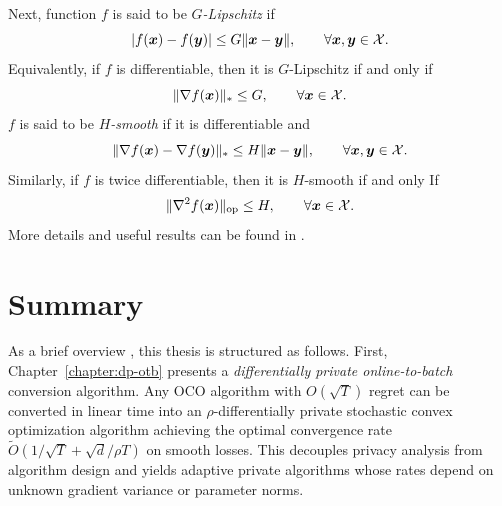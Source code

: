 Next, function $f$ is said to be \emph{$G$-Lipschitz} if 
\begin{equation}
    |f({\boldsymbol{x}}) - f({\boldsymbol{y}})| \le G\|{\boldsymbol{x}} - {\boldsymbol{y}}\|, \qquad \forall {\boldsymbol{x}},{\boldsymbol{y}}\in{\cal X}.
    \label{eqn:ch1:Lipschitz-defn}
\end{equation}
Equivalently, if $f$ is differentiable, then it is $G$-Lipschitz if and only if 
\begin{equation}
    \|\nabla f({\boldsymbol{x}})\|_\ast \le G, \qquad \forall {\boldsymbol{x}} \in {\cal X}.
    \label{eqn:ch1:Lipschitz}
\end{equation}
$f$ is said to be \emph{$H$-smooth} if it is differentiable and 
\begin{equation}
    \|\nabla f({\boldsymbol{x}}) - \nabla f({\boldsymbol{y}})\|_\ast \le H \|{\boldsymbol{x}}-{\boldsymbol{y}}\|, \qquad \forall {\boldsymbol{x}},{\boldsymbol{y}}\in{\cal X}.
    \label{eqn:ch1:smooth}
\end{equation}
Similarly, if $f$ is twice differentiable, then it is $H$-smooth if and only If
\begin{equation}
    \|\nabla^2 f({\boldsymbol{x}})\|_{\mathrm{op}} \le H, \qquad \forall {\boldsymbol{x}}\in{\cal X}.
\end{equation}
More details and useful results can be found in \citep{rockafellar1997convex}.





\section{Summary}
\label{sec:ch1:summary}

As a brief overview , this thesis is structured as follows. First, Chapter~\ref{chapter:dp-otb} presents a \emph{differentially private online-to-batch} conversion algorithm. Any OCO algorithm with $O(\sqrt{T})$ regret can be converted in linear time into an $\rho$-differentially private stochastic convex optimization algorithm achieving the optimal convergence rate $\tilde O(1/\sqrt{T} + \sqrt{d}/\rho T)$ on smooth losses. This decouples privacy analysis from algorithm design and yields adaptive private algorithms whose rates depend on unknown gradient variance or parameter norms.

